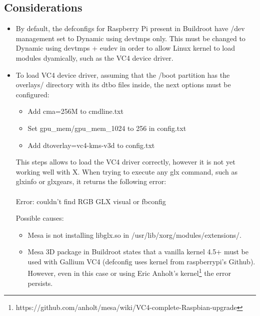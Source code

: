 \documentclass[12pt,a4paper,oneside]{article}
\begin{document}
\subsection*{Considerations}
\begin{itemize}
    \item By default, the defconfigs for Raspberry Pi present in Buildroot have
    /dev management set to {\selectfont Dynamic using devtmps only}.
    This must be changed to {\selectfont Dynamic using devtmps +
    eudev} in order to allow Linux kernel to load modules dyamically, such as the
    VC4 device driver.

    \item To load VC4 device driver, assuming that the {\selectfont
    /boot} partition has the {\selectfont overlays/} directory with
    its dtbo files inside, the next options must be configured:
    \begin{itemize}
      \item Add cma=256M to cmdline.txt
      \item Set gpu\_mem/gpu\_mem\_1024 to 256 in config.txt
      \item Add dtoverlay=vc4-kms-v3d to config.txt
    \end{itemize}

    This steps allows to load the VC4 driver correctly, however it is not yet
    working well with X. When trying to execute any {\selectfont
    glx} command, such as {\selectfont glxinfo} or
    {\selectfont glxgears}, it returns the following error:\\\\
    {\selectfont Error: couldn't find RGB GLX visual or fbconfig}

    Possible causes:
    \begin{itemize}
      \item Mesa is not installing libglx.so in {\selectfont
      /usr/lib/xorg/modules/extensions/}.
      \item Mesa 3D package in Buildroot states that a vanilla kernel 4.5+ must
      be used with Gallium VC4 (defconfig uses kernel from raspberrypi's Github).
      However, even in this case or using Eric Anholt's kernel\footnote{https://github.com/anholt/mesa/wiki/VC4-complete-Raspbian-upgrade}
      the error persists.
    \end{itemize}


\end {itemize}
\end{document}

